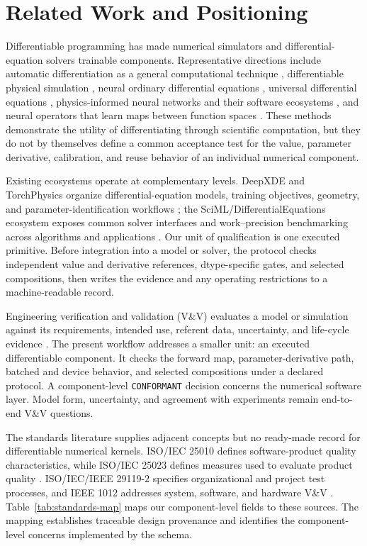 \documentclass[preprint,12pt]{elsarticle}
\begin{document}
\section{Related Work and Positioning}
Differentiable programming has made numerical simulators and differential-equation solvers trainable components. Representative directions include automatic differentiation as a general computational technique \citep{baydin2018autodiff}, differentiable physical simulation \citep{hu2020difftaichi,holl2020control}, neural ordinary differential equations \citep{chen2018neuralode}, universal differential equations \citep{rackauckas2020universal}, physics-informed neural networks and their software ecosystems \citep{raissi2019pinn,lu2021deepxde}, and neural operators that learn maps between function spaces \citep{kovachki2023neuraloperator}. These methods demonstrate the utility of differentiating through scientific computation, but they do not by themselves define a common acceptance test for the value, parameter derivative, calibration, and reuse behavior of an individual numerical component.

Existing ecosystems operate at complementary levels. DeepXDE and TorchPhysics organize differential-equation models, training objectives, geometry, and parameter-identification workflows \citep{lu2021deepxde,tanyu2023deeppde}; the SciML/DifferentialEquations ecosystem exposes common solver interfaces and work--precision benchmarking across algorithms and applications \citep{rackauckas2019confederated}. Our unit of qualification is one executed primitive. Before integration into a model or solver, the protocol checks independent value and derivative references, dtype-specific gates, and selected compositions, then writes the evidence and any operating restrictions to a machine-readable record.

Engineering verification and validation (V\&V) evaluates a model or simulation against its requirements, intended use, referent data, uncertainty, and life-cycle evidence \citep{nasa2024std7009}. The present workflow addresses a smaller unit: an executed differentiable component. It checks the forward map, parameter-derivative path, batched and device behavior, and selected compositions under a declared protocol. A component-level \texttt{CONFORMANT} decision concerns the numerical software layer. Model form, uncertainty, and agreement with experiments remain end-to-end V\&V questions.

The standards literature supplies adjacent concepts but no ready-made record for differentiable numerical kernels. ISO/IEC 25010 defines software-product quality characteristics, while ISO/IEC 25023 defines measures used to evaluate product quality \citep{iso25010_2023,iso25023_2016}. ISO/IEC/IEEE 29119-2 specifies organizational and project test processes, and IEEE 1012 addresses system, software, and hardware V\&V \citep{iso29119_2_2021,ieee1012_2024}. Table~\ref{tab:standards-map} maps our component-level fields to these sources. The mapping establishes traceable design provenance and identifies the component-level concerns implemented by the schema.
\end{document}
